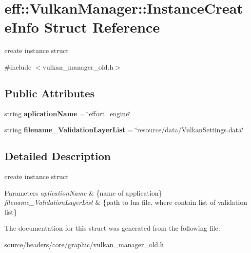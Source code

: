 \hypertarget{structeff_1_1VulkanManager_1_1InstanceCreateInfo}{}\section{eff\+:\+:Vulkan\+Manager\+:\+:Instance\+Create\+Info Struct Reference}
\label{structeff_1_1VulkanManager_1_1InstanceCreateInfo}


create instance struct  




{\ttfamily \#include $<$vulkan\+\_\+manager\+\_\+old.\+h$>$}

\subsection*{Public Attributes}
\begin{DoxyCompactItemize}
\item 
\mbox{\label{structeff_1_1VulkanManager_1_1InstanceCreateInfo_ad21bbb7b14eb46ef888707e7ad044fa5}} 
string {\bfseries aplication\+Name} = \char`\"{}effort\+\_\+engine\char`\"{}
\item 
\mbox{\label{structeff_1_1VulkanManager_1_1InstanceCreateInfo_aba44983d4e858cea9a0342a05b75908d}} 
string {\bfseries filename\+\_\+\+Validation\+Layer\+List} = \char`\"{}resource/data/Vulkan\+Settings.\+data\char`\"{}
\end{DoxyCompactItemize}


\subsection{Detailed Description}
create instance struct 


\begin{DoxyParams}{Parameters}
{\em aplication\+Name} & \{name of application\} \\
\hline
{\em filename\+\_\+\+Validation\+Layer\+List} & \{path to lua file, where contain list of validation list\} \\
\hline
\end{DoxyParams}


The documentation for this struct was generated from the following file\+:\begin{DoxyCompactItemize}
\item 
source/headers/core/graphic/vulkan\+\_\+manager\+\_\+old.\+h\end{DoxyCompactItemize}
